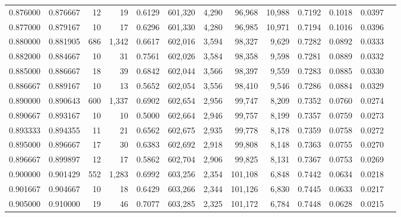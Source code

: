 \begin{tabular}{rrrrrrrrrrrrr}
0.876000 & 0.876667 &     12 &    19 &                                     0.6129 & 601,320 &   4,290 &  96,968 &  10,988 & 0.7192 & 0.1018 & 0.0397 \\
0.877000 & 0.879167 &     10 &    17 &                                     0.6296 & 601,330 &   4,280 &  96,985 &  10,971 & 0.7194 & 0.1016 & 0.0396 \\
0.880000 & 0.881905 &    686 & 1,342 &                                     0.6617 & 602,016 &   3,594 &  98,327 &   9,629 & 0.7282 & 0.0892 & 0.0333 \\
0.882000 & 0.884667 &     10 &    31 &                                     0.7561 & 602,026 &   3,584 &  98,358 &   9,598 & 0.7281 & 0.0889 & 0.0332 \\
0.885000 & 0.886667 &     18 &    39 &                                     0.6842 & 602,044 &   3,566 &  98,397 &   9,559 & 0.7283 & 0.0885 & 0.0330 \\
0.886667 & 0.889167 &     10 &    13 &                                     0.5652 & 602,054 &   3,556 &  98,410 &   9,546 & 0.7286 & 0.0884 & 0.0329 \\
0.890000 & 0.890643 &    600 & 1,337 &                                     0.6902 & 602,654 &   2,956 &  99,747 &   8,209 & 0.7352 & 0.0760 & 0.0274 \\
0.890667 & 0.893167 &     10 &    10 &                                     0.5000 & 602,664 &   2,946 &  99,757 &   8,199 & 0.7357 & 0.0759 & 0.0273 \\
0.893333 & 0.894355 &     11 &    21 &                                     0.6562 & 602,675 &   2,935 &  99,778 &   8,178 & 0.7359 & 0.0758 & 0.0272 \\
0.895000 & 0.896667 &     17 &    30 &                                     0.6383 & 602,692 &   2,918 &  99,808 &   8,148 & 0.7363 & 0.0755 & 0.0270 \\
0.896667 & 0.899897 &     12 &    17 &                                     0.5862 & 602,704 &   2,906 &  99,825 &   8,131 & 0.7367 & 0.0753 & 0.0269 \\
0.900000 & 0.901429 &    552 & 1,283 &                                     0.6992 & 603,256 &   2,354 & 101,108 &   6,848 & 0.7442 & 0.0634 & 0.0218 \\
0.901667 & 0.904667 &     10 &    18 &                                     0.6429 & 603,266 &   2,344 & 101,126 &   6,830 & 0.7445 & 0.0633 & 0.0217 \\
0.905000 & 0.910000 &     19 &    46 &                                     0.7077 & 603,285 &   2,325 & 101,172 &   6,784 & 0.7448 & 0.0628 & 0.0215 \\

\end{tabular}
